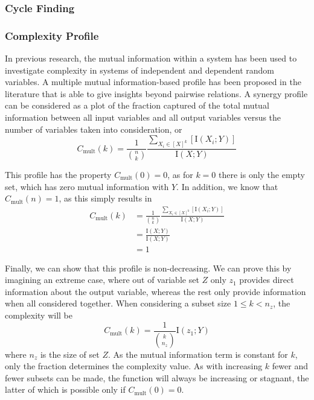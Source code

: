 \documentclass[../main.tex]{subfiles}
\begin{document}

\subsubsection{Cycle Finding}


\subsubsection{Complexity Profile}

In previous research, the mutual information within a system has been used to investigate complexity in systems of independent and dependent random variables.
A multiple mutual information-based profile has been proposed in the literature that is able to give insights beyond pairwise relations.
A synergy profile can be considered as a plot of the fraction captured of the total mutual information between all input variables and all output variables versus the number of variables taken into consideration, or
%
\begin{equation}
C_\mathrm{mult}(k) = \frac{1}{\binom{n}{k}}\frac{\sum_{X_i \in [X]^k} [\mathrm{I}(X_i;Y)]}{\mathrm{I}(X;Y)}
\end{equation}

This profile has the property $C_\mathrm{mult}(0) = 0$, as for $k = 0$ there is only the empty set, which has zero mutual information with $Y$.
In addition, we know that $C_\mathrm{mult}(n) = 1$, as this simply results in
%
\begin{align}
C_\mathrm{mult}(k) 
&= \frac{1}{\binom{n}{k}}\frac{\sum_{X_i \in [X]^k} [\mathrm{I}(X_i;Y)]}{\mathrm{I}(X;Y)} \\
&= \frac{\mathrm{I}(X;Y)}{\mathrm{I}(X;Y)} \\
&= 1
\end{align}

Finally, we can show that this profile is non-decreasing.
We can prove this by imagining an extreme case, where out of variable set $Z$ only $z_1$ provides direct information about the output variable, whereas the rest only provide information when all considered together.
When considering a subset size $1 \le k < n_z $, the complexity will be
%
\begin{equation}
C_\mathrm{mult}(k) = \frac{1}{\binom{k}{n_z}} \mathrm{I}(z_1;Y)
\end{equation}
%
where $n_z$ is the size of set $Z$.
As the mutual information term is constant for $k$, only the fraction determines the complexity value.
As with increasing $k$ fewer and fewer subsets can be made, the function will always be increasing or stagnant, the latter of which is possible only if $C_\mathrm{mult}(0) = 0$.
\end{document}
